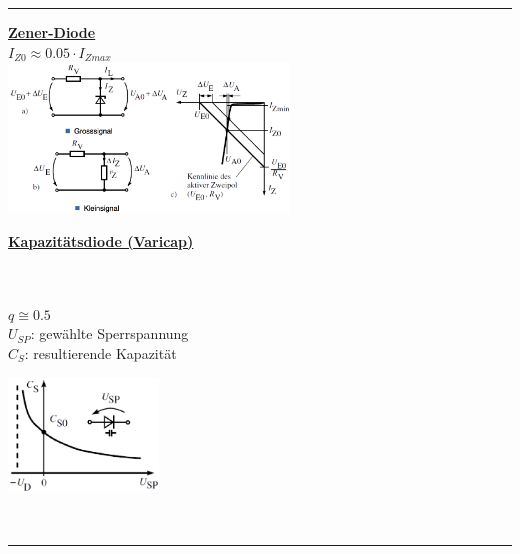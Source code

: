   \hrule
  \vspace{1mm}
   \begin{minipage}[t]{9cm}
    \underline{\bf Zener-Diode}\\
    $I_{Z0} \approx 0.05 \cdot I_{Zmax}$\\
    \includegraphics[height=4cm]{./bilder/ZDiodeEig} 
  \end{minipage}
  \begin{minipage}[t]{9cm}
    \underline{\bf Kapazit\"atsdiode (Varicap)}\\
    \begin{minipage}[t]{4.9cm}
      \\\\
      $q \cong 0.5$\\
      $U_{SP}$: gew\"ahlte Sperrspannung\\
      $C_S$: resultierende Kapazit\"at
    \end{minipage}
    \begin{minipage}{4cm}
      \includegraphics[width=4cm]{./bilder/CDiodeEig}
    \end{minipage}
  \end{minipage}\\
  
\hrule
